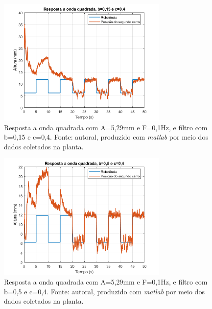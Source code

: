 \documentclass{ifacconf}
\begin{document}
\begin{figure}[!htb]
  \begin{center}
  \includegraphics[width=8.4cm]{figures/resultado_teste2.png}    %
  \caption{Resposta a onda quadrada com A=5,29mm e F=0,1Hz, e filtro com b=0,15 e c=0,4. Fonte: autoral, produzido com \textit{matlab} por meio dos dados coletados na planta.} 
  \label{fig:teste2}
  \end{center}
\end{figure}

\begin{figure}[!htb]
  \begin{center}
  \includegraphics[width=8.4cm]{figures/resultado_teste3.png}    %
  \caption{Resposta a onda quadrada com A=5,29mm e F=0,1Hz, e filtro com b=0,5 e c=0,4. Fonte: autoral, produzido com \textit{matlab} por meio dos dados coletados na planta.} 
  \label{fig:teste3}
  \end{center}
\end{figure}
\end{document}
